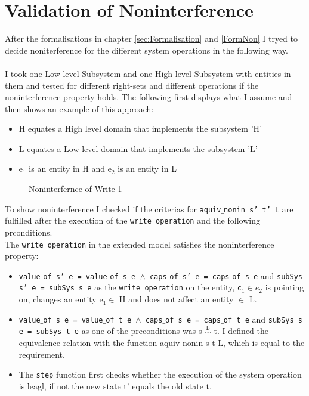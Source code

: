 \documentclass[11pt,a4paper,twoside]{article}
\begin{document}
{\section{Validation of Noninterference}\label{ValNon}
After the formalisations in chapter \ref{sec:Formalisation} and \ref{FormNon} I tryed to decide noniterference for the different system operations in the following way.\\ \\
I took one Low-level-Subsystem and one High-level-Subsystem with entities in them and tested for different right-sets and different operations if the noninterference-property holds. The following first displays what I assume and then shows an example of this approach: \\ 
\begin{itemize}
\item H equates a High level domain that implements the subsystem 'H'
\item L equates a Low level domain that implements the subsystem 'L'
\item e$_1$ is an entity in H and e$_2$ is an entity in L
\end{itemize}
\begin{figure}[H]
\caption{Noninterfernce of Write 1}
\end{figure}
To show noninterference I checked if the criterias for \texttt{aquiv$\_$nonin s' t' L} are fulfilled after the execution of the \texttt{write operation} and the following prconditions. \\ The \texttt{write operation} in the extended model satisfies the noninterference property: 
\begin{itemize}
\item \texttt{value$\_$of s' e = value$\_$of s e $\wedge$ caps$\_$of s' e = caps$\_$of s e} and \texttt{subSys s' e = subSys s e} as the \texttt{write operation} on the entity, \texttt{c$_1 \in e_2$} is pointing on, changes an entity e$_1 \in$ H and does not affect an entity $\in$ L.
\item \texttt{value$\_$of s e = value$\_$of t e $\wedge$ caps$\_$of s e = caps$\_$of t e} and \texttt{subSys s e = subSys t e} as one of the preconditions was s $\overset{\text{L}}{\sim}$ t. I defined the equivalence relation with the function aquiv$\_$nonin s t L, which is equal to the requirement. 
\item The \texttt{step} function first checks whether the execution of the system operation is leagl, if not the new state t' equals the old state t. \\

\end{itemize}}
\end{document}
